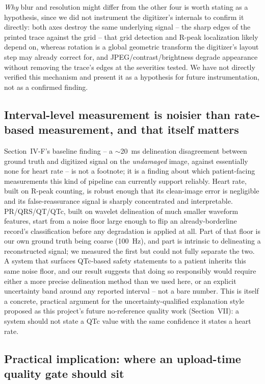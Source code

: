 \documentclass[conference]{IEEEtran}
\begin{document}
\emph{Why} blur and resolution might differ from the other four is worth stating as a
hypothesis, since we did not instrument the digitizer's internals to confirm it
directly: both axes destroy the same underlying signal -- the sharp edges of the
printed trace against the grid -- that grid detection and R-peak localization likely
depend on, whereas rotation is a global geometric transform the digitizer's layout
step may already correct for, and JPEG/contrast/brightness degrade appearance
without removing the trace's edges at the severities tested. We have not directly
verified this mechanism and present it as a hypothesis for future instrumentation,
not as a confirmed finding.

\subsection{Interval-level measurement is noisier than rate-based measurement, and
that itself matters}

Section~IV-F's baseline finding -- a $\sim$20~ms delineation disagreement between
ground truth and digitized signal on the \emph{undamaged} image, against essentially
none for heart rate -- is not a footnote; it is a finding about which patient-facing
measurements this kind of pipeline can currently support reliably. Heart rate, built
on R-peak counting, is robust enough that its clean-image error is negligible and its
false-reassurance signal is sharply concentrated and interpretable. PR/QRS/QT/QTc,
built on wavelet delineation of much smaller waveform features, start from a noise
floor large enough to flip an already-borderline record's classification before any
degradation is applied at all. Part of that floor is our own ground truth being
coarse (100~Hz), and part is intrinsic to delineating a reconstructed signal; we
measured the first but could not fully separate the two. A system that surfaces QTc-based safety statements to
a patient inherits this same noise floor, and our result suggests that doing so
responsibly would require either a more precise delineation method than we used here,
or an explicit uncertainty band around any reported interval -- not a bare number.
This is itself a concrete, practical argument for the uncertainty-qualified
explanation style proposed as this project's future no-reference quality work
(Section~VII): a system should not state a QTc value with the same confidence it
states a heart rate.

\subsection{Practical implication: where an upload-time quality gate should sit}
\end{document}
